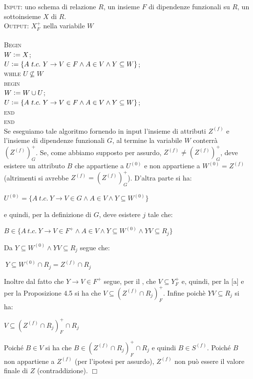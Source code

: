 \noindent\textsc{Input:} uno schema di relazione $R$, un insieme $F$ di dipendenze funzionali su $R$, un sottoinsieme
$X$ di $R$.\\
\textsc{Output:} $X^+_F$ nella variabile $W$\\\\
\textsc{Begin}\\
$W\vcentcolon= X$;\\
$U\vcentcolon= \{A\ t.c.\ Y \rightarrow V \in F \wedge A \in V \wedge Y \subseteq W\}$;\\
\textsc{while} $U \not \subseteq W$\\
\indent \textsc{begin}\\
\indent $W\vcentcolon = W \cup U$;\\
\indent $U\vcentcolon= \{A\ t.c.\ Y \rightarrow V \in F \wedge A \in V \wedge Y \subseteq W\}$;\\
\indent \textsc{end}\\
\textsc{end}\\

Se eseguiamo tale algoritmo fornendo in input l'insieme di attributi $Z^{(f)}$ e l'insieme di dipendenze 
funzionali $G$, al termine la variabile $W$ conterrà $(Z^{(f)})^+_G$. Se, come abbiamo supposto per assurdo,
$Z^{(f)}\not =(Z^{(f)})^+_G$, deve esistere un attributo $B$ che appartiene a $U^{(0)}$ e non appartiene 
a $W^{(0)} =Z^{(f)}$ (altrimenti si avrebbe $Z^{(f)} =(Z^{(f)})^+_G$). D'altra parte si ha:
\begin{center}
\begin{math}
U^{(0)} = \{A\ t.c.\ Y \rightarrow V \in G \wedge A \in V \wedge Y \subseteq W^{(0)}\}
\end{math}
\end{center}
e quindi, per la definizione di $G$, deve esistere $j$ tale che:
\begin{center}
 \begin{math}
  B \in \{A\ t.c.\ Y \rightarrow V \in F^+ \wedge A \in V \wedge Y \subseteq W^{(0)} \wedge YV \subseteq R_j\}
 \end{math}
\end{center}
Da $Y \subseteq W^{(0)} \wedge YV \subseteq R_j$ segue che:
\begin{center}
 \begin{math}
  [a]\ Y \subseteq W^{(0)} \cap R_j = Z^{(f)} \cap R_j
 \end{math}
\end{center}
Inoltre dal fatto che $Y \rightarrow V \in F^+$ segue, per il , che $V \subseteq Y^+_F$
e, quindi, per la [a] e per la Proposizione 4.5 si ha che $V \subseteq (Z^{(f)} \cap R_j)^+_F$. Infine 
poichè $YV \subseteq R_j$ si ha:
\begin{center}
 \begin{math}
 V \subseteq (Z^{(f)} \cap R_j)^+_F \cap R_j
 \end{math}
\end{center}
Poiché $B \in V$ si ha che $B \in (Z^{(f)} \cap R_j)^+_F \cap R_j$ e quindi $B \in S^{(f)}$. Poiché $B$ non 
appartiene a $Z^{(f)}$ (per l'ipotesi per assurdo), $Z^{(f)}$ non può essere il valore finale di $Z$ 
(contraddizione). \hfill $\Box$

